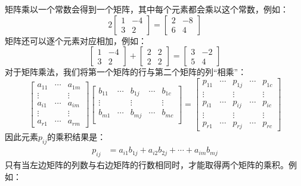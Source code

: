 \documentclass[lang=cn,12pt]{elegantbook}
\begin{document}
矩阵乘以一个常数会得到一个矩阵，其中每个元素都会乘以这个常数，例如：
$$
2\left[\begin{array}{rr}
1 & -4 \\
3 & 2
\end{array}\right]=\left[\begin{array}{rr}
2 & -8 \\
6 & 4
\end{array}\right]
$$
矩阵还可以逐个元素对应相加，例如：
$$
\left[\begin{array}{rr}
1 & -4 \\
3 & 2
\end{array}\right]+\left[\begin{array}{ll}
2 & 2 \\
2 & 2
\end{array}\right]=\left[\begin{array}{rr}
3 & -2 \\
5 & 4
\end{array}\right]
$$
对于矩阵乘法，我们将第一个矩阵的行与第二个矩阵的列“相乘”：
$$
\begin{bmatrix}  
  a_{11} & \cdots & a_{1m} \\  
  \vdots & & \vdots \\  
  a_{i1} & \cdots & a_{im} \\
  \vdots & & \vdots \\ 
  a_{r1} & \cdots & a_{rm}  
\end{bmatrix}
\begin{bmatrix}  
  b_{11} & \cdots & b_{1j} & \cdots & b_{1c} \\  
  \vdots & & \vdots & & \vdots \\  
  b_{m1} & \cdots &b_{mj} &\cdots & b_{mc} \\
\end{bmatrix}
=
\begin{bmatrix}
  p_{11}&\cdots  &p_{1j}  &\cdots  &p_{1c} \\
  \vdots&  &\vdots  &  &\vdots \\
  p_{i1}&\cdots &p_{ij}  &\cdots  &p_{ic} \\
  \vdots&  &\vdots  &  &\vdots \\
  p_{r1}&\cdots  &p_{rj}  &\cdots  &p_{rc}
\end{bmatrix}
$$
因此元素$p_{ij}$的乘积结果是：
\begin{align}
p_{ij} & = a_{i1}b_{1j} + a_{i2}b_{2j}+ \cdots + a_{im}b_{mj}
\end{align}
只有当左边矩阵的列数与右边矩阵的行数相同时，才能取得两个矩阵的乘积。例如：
\end{document}
